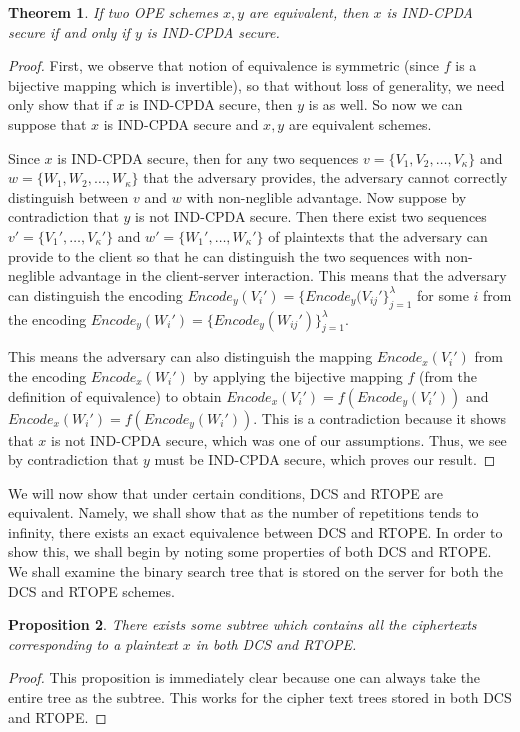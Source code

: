 \documentclass[12pt]{article}
\newtheorem{theorem}{Theorem}[section]
\newtheorem{proposition}[theorem]{Proposition}
\begin{document}
\begin{theorem}
 If two OPE schemes $x,y$ are equivalent, then $x$ is IND-CPDA secure if and only if $y$ is IND-CPDA secure.
\end{theorem}
\begin{proof}
  First, we observe that notion of equivalence is symmetric (since $f$ is a bijective mapping which is invertible), so that without loss of generality, we need only show that if $x$ is IND-CPDA secure, then $y$ is as well. So now we can suppose that $x$ is IND-CPDA secure and $x,y$ are equivalent schemes.

  Since $x$ is IND-CPDA secure, then for any two sequences $v = \{V_1, V_2, \ldots, V_{\kappa}\}$ and $w = \{W_1, W_2, \ldots, W_{\kappa} \}$ that the adversary provides, the adversary cannot correctly distinguish between $v$ and $w$ with non-neglible advantage. Now suppose by contradiction that $y$ is not IND-CPDA secure. Then there exist two sequences $v' = \{V_1', \ldots, V_{\kappa}'\}$ and $w' = \{W_1', \ldots, W_{\kappa}'\}$ of plaintexts that the adversary can provide to the client so that he can distinguish the two sequences with non-neglible advantage in the client-server interaction. This means that the adversary can distinguish the encoding $Encode_y(V_i') = \{Encode_y(V_{ij}' \}_{j=1}^{\lambda}$ for some $i$ from the encoding $Encode_y(W_i') = \{Encode_y(W_{ij}') \}_{j=1}^{\lambda}$.

  This means the adversary can also distinguish the mapping $Encode_x(V_i')$ from the encoding $Encode_x(W_i')$ by applying the bijective mapping $f$ (from the definition of equivalence) to obtain $Encode_x(V_i') = f(Encode_y(V_i'))$ and $Encode_x(W_i') = f(Encode_y(W_i'))$. This is a contradiction because it shows that $x$ is not IND-CPDA secure, which was one of our assumptions. Thus, we see by contradiction that $y$ must be IND-CPDA secure, which proves our result.
\end{proof}

We will now show that under certain conditions, DCS and RTOPE are equivalent. Namely, we shall show that as the number of repetitions tends to infinity, there exists an exact equivalence between DCS and RTOPE. In order to show this, we shall begin by noting some properties of both DCS and RTOPE. We shall examine the binary search tree that is stored on the server for both the DCS and RTOPE schemes. 

\begin{proposition}
  There exists some subtree which contains all the ciphertexts corresponding to a plaintext $x$ in both DCS and RTOPE.
\end{proposition}
\begin{proof}
  This proposition is immediately clear because one can always take the entire tree as the subtree. This works for the cipher text trees stored in both DCS and RTOPE.
\end{proof}
\end{document}
